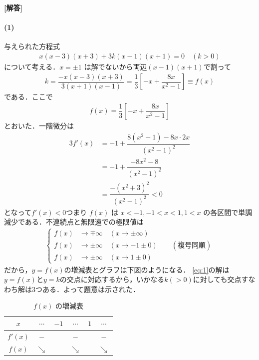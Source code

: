 \documentclass[../../main.tex]{subfiles}
\begin{document}
\begin{oframed}
  
\end{oframed}

{\bf [解答]}

\paragraph{(1)}

与えられた方程式
\begin{align}
  x(x-3)(x+3)+3k(x-1)(x+1)=0 \quad (k>0) \label{eq:1}
\end{align}
について考える．$x = \pm 1$ は解でないから両辺$(x-1)(x+1)$で割って
\begin{align}
  k = \dfrac{-x(x-3)(x+3)}{3(x+1)(x-1)} = \dfrac{1}{3}\left[ -x + \dfrac{8x}{x^2-1} \right] \equiv f(x) \label{eq:2}
\end{align}
である．ここで
\begin{align}
  f(x) = \dfrac{1}{3}\left[-x + \dfrac{8x}{x^2-1}\right] \label{eq:3}
\end{align}
とおいた．一階微分は
\begin{align}
  3f'(x)
  & = -1 + \dfrac{8(x^2-1) - 8x \cdot 2x}{(x^2-1)^2} \\
  & = -1 + \dfrac{-8x^2-8}{(x^2-1)^2} \\
  & = \dfrac{-(x^2+3)^2}{(x^2-1)^2} < 0
\end{align}
となって$f'(x)<0$つまり $f(x)$ は $x < -1, -1 < x < 1, 1 < x$ の各区間で単調減少である．不連続点と無限遠での極限値は
\begin{align}
  \begin{cases}
    f(x) &\longrightarrow \mp \infty \quad (x \to \pm \infty) \\
    f(x) &\longrightarrow \pm \infty \quad (x \to -1 \pm 0) \qquad (\text{複号同順}) \\
    f(x) &\longrightarrow \pm \infty \quad (x \to 1 \pm 0)
  \end{cases}
\end{align}
だから，$y=f(x)$の増減表とグラフは下図のようになる．
\cref{eq:1}の解は$y=f(x)$と$y=k$の交点に対応するから，いかなる$k (>0)$に対しても交点すなわち解は$3$つある．よって題意は示された．

\begin{table}[htb]
  \centering
  \caption{$f(x)$ の増減表}
  \label{tab:1967_1_variation}
  \begin{tabular}{c|ccccc}
    $x$ & $\cdots$ & $-1$ & $\cdots$ & $1$ & $\cdots$ \\ \hline
    $f'(x)$ & $-$ & & $-$ & & $-$ \\ \hline
    $f(x)$ & $\searrow$ & & $\searrow$ & & $\searrow$
  \end{tabular}
\end{table}
\end{document}
